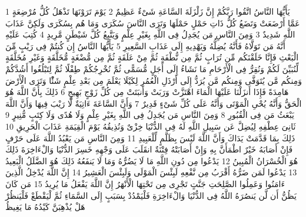 \documentclass[20pt,a4paper]{article}
\title{}
\author{}
\date{}
\begin{document}
\pagecolor{cl_page}



{\tiny\colorbox{cl_aya}{1}} يَأَيُّهَا النَّاسُ اتَّقُوا رَبَّكُمْ إِنَّ زَلْزَلَةَ السَّاعَةِ شَىْءٌ عَظِيمٌ
{\tiny\colorbox{cl_aya}{2}} يَوْمَ تَرَوْنَهَا تَذْهَلُ كُلُّ مُرْضِعَةٍ عَمَّا أَرْضَعَتْ وَتَضَعُ كُلُّ ذَاتِ حَمْلٍ حَمْلَهَا وَتَرَى النَّاسَ سُكَرَى وَمَا هُم بِسُكَرَى وَلَكِنَّ عَذَابَ اللَّهِ شَدِيدٌ
{\tiny\colorbox{cl_aya}{3}} وَمِنَ النَّاسِ مَن يُجَدِلُ فِى اللَّهِ بِغَيْرِ عِلْمٍ وَيَتَّبِعُ كُلَّ شَيْطَنٍ مَّرِيدٍ
{\tiny\colorbox{cl_aya}{4}} كُتِبَ عَلَيْهِ أَنَّهُ مَن تَوَلَّاهُ فَأَنَّهُ يُضِلُّهُ وَيَهْدِيهِ إِلَى عَذَابِ السَّعِيرِ
{\tiny\colorbox{cl_aya}{5}} يَأَيُّهَا النَّاسُ إِن كُنتُمْ فِى رَيْبٍ مِّنَ الْبَعْثِ فَإِنَّا خَلَقْنَكُم مِّن تُرَابٍ ثُمَّ مِن نُّطْفَةٍ ثُمَّ مِنْ عَلَقَةٍ ثُمَّ مِن مُّضْغَةٍ مُّخَلَّقَةٍ وَغَيْرِ مُخَلَّقَةٍ لِّنُبَيِّنَ لَكُمْ وَنُقِرُّ فِى الْأَرْحَامِ مَا نَشَاءُ إِلَى أَجَلٍ مُّسَمًّى ثُمَّ نُخْرِجُكُمْ طِفْلًا ثُمَّ لِتَبْلُغُوا أَشُدَّكُمْ وَمِنكُم مَّن يُتَوَفَّى وَمِنكُم مَّن يُرَدُّ إِلَى أَرْذَلِ الْعُمُرِ لِكَيْلَا يَعْلَمَ مِن بَعْدِ عِلْمٍ شَئًْا وَتَرَى الْأَرْضَ هَامِدَةً فَإِذَا أَنزَلْنَا عَلَيْهَا الْمَاءَ اهْتَزَّتْ وَرَبَتْ وَأَنبَتَتْ مِن كُلِّ زَوْجٍ بَهِيجٍ
{\tiny\colorbox{cl_aya}{6}} ذَلِكَ بِأَنَّ اللَّهَ هُوَ الْحَقُّ وَأَنَّهُ يُحْىِ الْمَوْتَى وَأَنَّهُ عَلَى كُلِّ شَىْءٍ قَدِيرٌ
{\tiny\colorbox{cl_aya}{7}} وَأَنَّ السَّاعَةَ ءَاتِيَةٌ لَّا رَيْبَ فِيهَا وَأَنَّ اللَّهَ يَبْعَثُ مَن فِى الْقُبُورِ
{\tiny\colorbox{cl_aya}{8}} وَمِنَ النَّاسِ مَن يُجَدِلُ فِى اللَّهِ بِغَيْرِ عِلْمٍ وَلَا هُدًى وَلَا كِتَبٍ مُّنِيرٍ
{\tiny\colorbox{cl_aya}{9}} ثَانِىَ عِطْفِهِ لِيُضِلَّ عَن سَبِيلِ اللَّهِ لَهُ فِى الدُّنْيَا خِزْىٌ وَنُذِيقُهُ يَوْمَ الْقِيَمَةِ عَذَابَ الْحَرِيقِ
{\tiny\colorbox{cl_aya}{10}} ذَلِكَ بِمَا قَدَّمَتْ يَدَاكَ وَأَنَّ اللَّهَ لَيْسَ بِظَلَّمٍ لِّلْعَبِيدِ
{\tiny\colorbox{cl_aya}{11}} وَمِنَ النَّاسِ مَن يَعْبُدُ اللَّهَ عَلَى حَرْفٍ فَإِنْ أَصَابَهُ خَيْرٌ اطْمَأَنَّ بِهِ وَإِنْ أَصَابَتْهُ فِتْنَةٌ انقَلَبَ عَلَى وَجْهِهِ خَسِرَ الدُّنْيَا وَالْءَاخِرَةَ ذَلِكَ هُوَ الْخُسْرَانُ الْمُبِينُ
{\tiny\colorbox{cl_aya}{12}} يَدْعُوا مِن دُونِ اللَّهِ مَا لَا يَضُرُّهُ وَمَا لَا يَنفَعُهُ ذَلِكَ هُوَ الضَّلَلُ الْبَعِيدُ
{\tiny\colorbox{cl_aya}{13}} يَدْعُوا لَمَن ضَرُّهُ أَقْرَبُ مِن نَّفْعِهِ لَبِئْسَ الْمَوْلَى وَلَبِئْسَ الْعَشِيرُ
{\tiny\colorbox{cl_aya}{14}} إِنَّ اللَّهَ يُدْخِلُ الَّذِينَ ءَامَنُوا وَعَمِلُوا الصَّلِحَتِ جَنَّتٍ تَجْرِى مِن تَحْتِهَا الْأَنْهَرُ إِنَّ اللَّهَ يَفْعَلُ مَا يُرِيدُ
{\tiny\colorbox{cl_aya}{15}} مَن كَانَ يَظُنُّ أَن لَّن يَنصُرَهُ اللَّهُ فِى الدُّنْيَا وَالْءَاخِرَةِ فَلْيَمْدُدْ بِسَبَبٍ إِلَى السَّمَاءِ ثُمَّ لْيَقْطَعْ فَلْيَنظُرْ هَلْ يُذْهِبَنَّ كَيْدُهُ مَا يَغِيظُ
\end{document}
